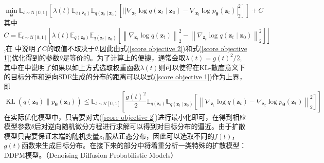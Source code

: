 \begin{equation}
    \min _{\boldsymbol{\theta}} \mathbb{E}_{t \sim \mathcal{U}[0,1]}\left[\lambda(t) \mathbb{E}_{q\left(\mathbf{z}_0\right)} \mathbb{E}_{q\left(\mathbf{z}_t \mid \mathbf{z}_0\right)}\left[|| \nabla_{\mathbf{z}_t} \log q\left(\mathbf{z}_t \mid \mathbf{z}_0\right)-\left.\nabla_{\mathbf{z}_t} \log p_{\boldsymbol{\theta}}\left(\mathbf{z}_t\right)\right|_2 ^2\right]\right]+C
    \label{score objective 2}
\end{equation}
其中$C=\mathbb{E}_{t \sim \mathcal{U}[0,1]}\left[\lambda(t) \mathbb{E}_{q\left(\mathbf{z}_0\right)} \mathbb{E}_{q\left(\mathbf{z}_t \mid \mathbf{z}_0\right)}\left[\left\|\nabla_{\mathbf{z}_t} \log q\left(\mathbf{z}_t\right)\right\|_2^2-\left\|\nabla_{\mathbf{z}_t} \log q\left(\mathbf{z}_t \mid \mathbf{z}_0\right)\right\|_2^2\right]\right]$,在
\cite{vincent}中说明了$C$的取值不取决于$\theta$,因此由式(\ref{score objective 2})和式(\ref{score objective 1})优化得到的参数$\theta$是等价的。为了计算上的便捷，通常会取$\lambda(t) = g(t)^2/2$, 其中在\cite{song_2}中说明了如果以如上方式选取权重函数$\lambda(t)$则可以使得在KL-散度意义下的目标分布和逆向SDE生成的分布的距离可以以式(\ref{score objective 1})作为上界，即
\begin{equation}
\operatorname{KL}\left(q\left(\mathbf{z}_0\right) \| p_{\boldsymbol{\theta}}\left(\mathbf{z}_0\right)\right) \leq \mathbb{E}_{t \sim \mathcal{U}[0,1]}\left[\frac{g(t)^2}{2} \mathbb{E}_{q\left(\mathbf{z}_0\right)} \mathbb{E}_{q\left(\mathbf{z}_t \mid \mathbf{z}_0\right)}\left[\left\|\nabla_{\mathbf{z}_t} \log q\left(\mathbf{z}_t\right)-\nabla_{\mathbf{z}_t} \log p_{\boldsymbol{\theta}}\left(\mathbf{z}_t\right)\right\|_2^2\right]\right]
    \label{KL upper bound 1}
\end{equation}
在实际优化模型中，只需要对式(\ref{score objective 2})进行最小化即可，在得到相应模型参数$\theta$后对逆向随机微分方程进行求解可以得到对目标分布的逼近。由于扩散模型只需要保证末端的随机变量$z_1$服从正态分布，因此可以选取不同的$f(t)$，$g(t)$函数来生成目标分布。在接下来的部分中将着重分析一类特殊的扩散模型：DDPM模型。（Denoising Diffusion Probabilistic Models）
